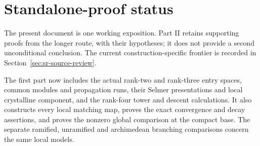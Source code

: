 \documentclass[10pt]{article}
\theoremstyle{definition}
\theoremstyle{plain}
\begin{document}

























































\section*{Standalone-proof status}
The present document is one working exposition. Part II retains
supporting proofs from the longer route, with their hypotheses;
it does not provide a second unconditional conclusion.
The current construction-specific frontier is recorded in
Section~\ref{sec:sr-source-review}.

The first part now includes the actual rank-two and rank-three
entry spaces, common modules and propagation runs, their Selmer
presentations and local crystalline component, and the rank-four
tower and descent calculations.
It also constructs every local matching map, proves the exact
convergence and decay assertions, and proves the nonzero global
comparison at the compact base. The separate ramified,
unramified and archimedean branching comparisons concern the
same local models.
\end{document}
